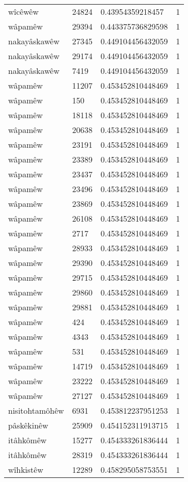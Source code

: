 \begin{longtable}{llll}
wîcêwêw & 24824 & 0.43954359218457 & 1\\
wâpamêw & 29394 & 0.443375736829598 & 1\\
nakayâskawêw & 27345 & 0.449104456432059 & 1\\
nakayâskawêw & 29174 & 0.449104456432059 & 1\\
nakayâskawêw & 7419 & 0.449104456432059 & 1\\
wâpamêw & 11207 & 0.453452810448469 & 1\\
wâpamêw & 150 & 0.453452810448469 & 1\\
wâpamêw & 18118 & 0.453452810448469 & 1\\
wâpamêw & 20638 & 0.453452810448469 & 1\\
wâpamêw & 23191 & 0.453452810448469 & 1\\
wâpamêw & 23389 & 0.453452810448469 & 1\\
wâpamêw & 23437 & 0.453452810448469 & 1\\
wâpamêw & 23496 & 0.453452810448469 & 1\\
wâpamêw & 23869 & 0.453452810448469 & 1\\
wâpamêw & 26108 & 0.453452810448469 & 1\\
wâpamêw & 2717 & 0.453452810448469 & 1\\
wâpamêw & 28933 & 0.453452810448469 & 1\\
wâpamêw & 29390 & 0.453452810448469 & 1\\
wâpamêw & 29715 & 0.453452810448469 & 1\\
wâpamêw & 29860 & 0.453452810448469 & 1\\
wâpamêw & 29881 & 0.453452810448469 & 1\\
wâpamêw & 424 & 0.453452810448469 & 1\\
wâpamêw & 4343 & 0.453452810448469 & 1\\
wâpamêw & 531 & 0.453452810448469 & 1\\
wâpamêw & 14719 & 0.453452810448469 & 1\\
wâpamêw & 23222 & 0.453452810448469 & 1\\
wâpamêw & 27127 & 0.453452810448469 & 1\\
nisitohtamôhêw & 6931 & 0.453812237951253 & 1\\
pâskêkinêw & 25909 & 0.454152311913715 & 1\\
itâhkômêw & 15277 & 0.454333261836444 & 1\\
itâhkômêw & 28319 & 0.454333261836444 & 1\\
wîhkistêw & 12289 & 0.458295058753551 & 1\\

\end{longtable}
